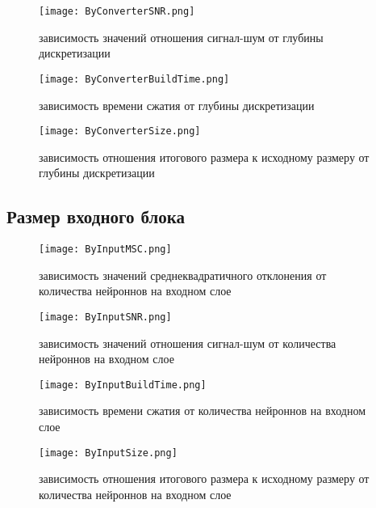 \begin{figure}[ht]
\centering
  \texttt{[image: ByConverterSNR.png]}
  \caption{ зависимость значений отношения сигнал-шум от глубины дискретизации }
  \label{fig:by_converter_snr}
\end{figure}

\begin{figure}[ht]
\centering
  \texttt{[image: ByConverterBuildTime.png]}
  \caption{ зависимость времени сжатия от глубины дискретизации }
  \label{fig:by_converter_build_time}
\end{figure}

\begin{figure}[ht]
\centering
  \texttt{[image: ByConverterSize.png]}
  \caption{ зависимость отношения итогового размера к исходному размеру от глубины дискретизации }
  \label{fig:by_converter_build_time}
\end{figure}

\subsection{Размер входного блока}
\label{sub:analysis:input}

\begin{figure}[ht]
\centering
  \texttt{[image: ByInputMSC.png]}
  \caption{ зависимость значений среднеквадратичного отклонения от количества нейроннов на входном слое }
  \label{fig:by_input_msc}
\end{figure}

\begin{figure}[ht]
\centering
  \texttt{[image: ByInputSNR.png]}
  \caption{ зависимость значений отношения сигнал-шум от количества нейроннов на входном слое }
  \label{fig:by_input_snr}
\end{figure}

\begin{figure}[ht]
\centering
  \texttt{[image: ByInputBuildTime.png]}
  \caption{ зависимость времени сжатия от количества нейроннов на входном слое }
  \label{fig:by_input_build_time}
\end{figure}

\begin{figure}[ht]
\centering
  \texttt{[image: ByInputSize.png]}
  \caption{ зависимость отношения итогового размера к исходному размеру от количества нейроннов на входном слое }
  \label{fig:by_input_build_time}
\end{figure}

